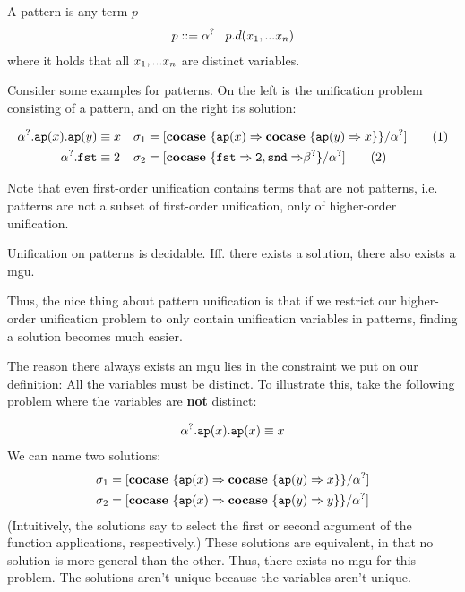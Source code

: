 \documentclass[twoside,12pt,a4paper]{article}
\begin{document}
\begin{definition}[Pattern]
    A pattern is any term $p$ 
    \begin{align*}
        p ::= \alpha^? \;|\; p.d(x_1,...x_n)
    \end{align*}
    where it holds that all $x_1,...x_n$ are distinct variables.
\end{definition}

Consider some examples for patterns. On the left is the unification problem consisting of a pattern, and on the right its solution:
\begin{example}[Pattern]
    \begin{align*}
        \alpha^?.\texttt{ap}(x).\texttt{ap}(y)&\equiv x &\sigma_1 &= [\textbf{cocase}\ \{\texttt{ap}(x)\Rightarrow\textbf{cocase}\ \{\texttt{ap}(y)\Rightarrow x\}\}/\alpha^?] \tag{1}\\
        \alpha^?.\mathtt{fst} &\equiv 2 &\sigma_2 &= [\textbf{cocase}\ \{\mathtt{fst\Rightarrow 2, snd \Rightarrow}\beta^?\}/\alpha^?] \tag{2}
    \end{align*}   
\end{example}

Note that even first-order unification contains terms that are not patterns, i.e.
patterns are not a subset of first-order unification, only of higher-order unification.

\begin{theorem}
    Unification on patterns is decidable.
    Iff. there exists a solution, there also exists a mgu.
\end{theorem}
Thus, the nice thing about pattern unification is that if we restrict our higher-order unification problem to only contain unification variables in patterns, 
finding a solution becomes much easier. 

The reason there always exists an mgu lies in the constraint we put on our definition: All the variables must be distinct. 
To illustrate this, take the following problem where the variables are \textbf{not} distinct:
\begin{example}
    \begin{align*}
        \alpha^?.\texttt{ap}(x).\texttt{ap}(x)\equiv x
    \end{align*}  
    We can name two solutions:
\begin{align*}
    \sigma_1 &= [\textbf{cocase}\ \{\texttt{ap}(x)\Rightarrow \textbf{cocase}\ \{\texttt{ap}(y)\Rightarrow x\}\}/\alpha^?]\\
    \sigma_2 &=[\textbf{cocase}\ \{\texttt{ap}(x)\Rightarrow \textbf{cocase}\ \{\texttt{ap}(y)\Rightarrow y\}\}/\alpha^?]  
\end{align*}
(Intuitively, the solutions say to select the first or second argument of the function applications, respectively.)
These solutions are equivalent, in that no solution is more general than the other. Thus, there exists no mgu for this problem.
The solutions aren't unique because the variables aren't unique.  
\end{example}
\end{document}
